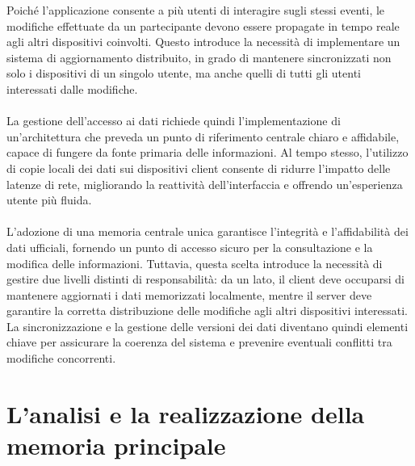 Poiché l’applicazione consente a più utenti di interagire sugli stessi eventi, le modifiche effettuate da un partecipante devono essere propagate in tempo reale agli altri dispositivi coinvolti. 
Questo introduce la necessità di implementare un sistema di aggiornamento distribuito, in grado di mantenere sincronizzati non solo i dispositivi di un singolo utente, 
ma anche quelli di tutti gli utenti interessati dalle modifiche.\\
\\
La gestione dell’accesso ai dati richiede quindi l’implementazione di un’architettura che preveda un punto di riferimento centrale chiaro e affidabile, 
capace di fungere da fonte primaria delle informazioni. 
Al tempo stesso, l’utilizzo di copie locali dei dati sui dispositivi client consente di ridurre l’impatto delle latenze di rete, 
migliorando la reattività dell’interfaccia e offrendo un’esperienza utente più fluida.\\
\\
L’adozione di una memoria centrale unica garantisce l’integrità e l’affidabilità dei dati ufficiali, 
fornendo un punto di accesso sicuro per la consultazione e la modifica delle informazioni. 
Tuttavia, questa scelta introduce la necessità di gestire due livelli distinti di responsabilità: 
da un lato, il client deve occuparsi di mantenere aggiornati i dati memorizzati localmente, 
mentre il server deve garantire la corretta distribuzione delle modifiche agli altri dispositivi interessati. 
La sincronizzazione e la gestione delle versioni dei dati diventano quindi elementi chiave per assicurare la coerenza del sistema e prevenire eventuali conflitti tra modifiche concorrenti.

\clearpage
\section{L'analisi e la realizzazione della memoria principale}

	

